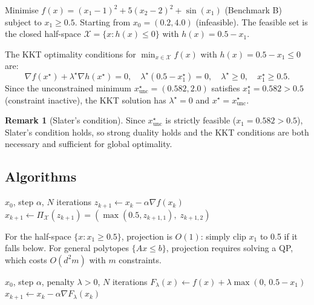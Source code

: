 \documentclass[11pt,a4paper]{article}
\theoremstyle{definition}
\newtheorem{remark}[theorem]{Remark}
\begin{document}
Minimise $f(x) = (x_1-1)^2 + 5(x_2-2)^2 + \sin(x_1)$ (Benchmark B) subject to $x_1 \geq 0.5$. Starting from $x_0 = (0.2, 4.0)$ (infeasible). The feasible set is the closed half-space $\mathcal{X} = \{x : h(x) \leq 0\}$ with $h(x) = 0.5 - x_1$.

The KKT optimality conditions for $\min_{x \in \mathcal{X}} f(x)$ with $h(x) = 0.5 - x_1 \leq 0$ are:
\begin{equation}
\nabla f(x^{\star}) + \lambda^{\star} \nabla h(x^{\star}) = 0, \quad \lambda^{\star}(0.5 - x_1^{\star}) = 0, \quad \lambda^{\star} \geq 0, \quad x_1^{\star} \geq 0.5.
\end{equation}
Since the unconstrained minimum $x^{\star}_{\text{unc}} = (0.582, 2.0)$ satisfies $x_1^{\star} = 0.582 > 0.5$ (constraint inactive), the KKT solution has $\lambda^{\star} = 0$ and $x^{\star} = x^{\star}_{\text{unc}}$.

\begin{remark}[Slater's condition]
Since $x^{\star}_{\text{unc}}$ is strictly feasible ($x_1 = 0.582 > 0.5$), Slater's condition holds, so strong duality holds and the KKT conditions are both necessary and sufficient for global optimality.
\end{remark}

\subsection{Algorithms}

\begin{algorithm}[H]
\caption{Projected Gradient Descent}
\label{alg:pgd}
\begin{algorithmic}[1]
\Require $x_0$, step $\alpha$, $N$ iterations
    \State $z_{k+1} \gets x_k - \alpha \nabla f(x_k)$ 
    \State $x_{k+1} \gets \Pi_{\mathcal{X}}(z_{k+1}) = (\max(0.5, z_{k+1,1}),\; z_{k+1,2})$ 
\EndFor
\end{algorithmic}
\end{algorithm}

For the half-space $\{x : x_1 \geq 0.5\}$, projection is $O(1)$: simply clip $x_1$ to 0.5 if it falls below. For general polytopes $\{Ax \leq b\}$, projection requires solving a QP, which costs $O(d^2 m)$ with $m$ constraints.

\begin{algorithm}[H]
\caption{$L_1$ Penalty Method}
\label{alg:penalty}
\begin{algorithmic}[1]
\Require $x_0$, step $\alpha$, penalty $\lambda > 0$, $N$ iterations
    \State $F_\lambda(x) \gets f(x) + \lambda \max(0,\, 0.5 - x_1)$ 
    \State $x_{k+1} \gets x_k - \alpha \nabla F_\lambda(x_k)$
\EndFor
\end{algorithmic}
\end{algorithm}
\end{document}

